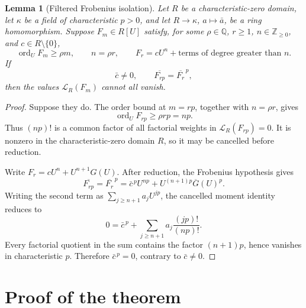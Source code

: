 \documentclass[11pt]{article}
\newtheorem{lemma}[theorem]{Lemma}
\newcommand{\ord}{\operatorname{ord}}
\begin{document}
\begin{lemma}[Filtered Frobenius isolation]
\label{lem:filtered-frobenius}
Let \(R\) be a characteristic-zero domain, let \(\kappa\) be a field of
characteristic \(p>0\), and let \(R\to\kappa\), \(a\mapsto\bar a\), be a
ring homomorphism.  Suppose \(F_m\in R[U]\) satisfy, for some
\(\rho\in\mathbb Q\), \(r\geq1\), \(n\in\mathbb Z_{\geq0}\), and
\(c\in R\setminus\{0\}\),
\[
  \ord_UF_m\geq\rho m,\qquad
  n=\rho r,\qquad
  F_r=cU^n+\text{terms of degree greater than }n.
\]
If
\[
  \bar c\neq0,\qquad
  \overline{F_{rp}}=\overline{F_r}^{\,p},
\]
then the values \(\mathcal L_R(F_m)\) cannot all vanish.
\end{lemma}

\begin{proof}
Suppose they do.  The order bound at \(m=rp\), together with
\(n=\rho r\), gives
\[
  \ord_UF_{rp}\geq \rho rp=np.
\]
Thus \((np)!\) is a common factor of all factorial weights in
\(\mathcal L_R(F_{rp})=0\).  It is nonzero in the characteristic-zero
domain \(R\), so it may be cancelled before reduction.

Write \(F_r=cU^n+U^{n+1}G(U)\).  After reduction, the Frobenius hypothesis
gives
\[
  \overline{F_{rp}}
  =\overline{F_r}^{\,p}
  =\bar c^{\,p}U^{np}+U^{(n+1)p}\overline{G}(U)^p.
\]
Writing the second term as
\(\sum_{j\geq n+1}a_jU^{jp}\), the cancelled moment identity reduces to
\[
  0=\bar c^{\,p}
    +\sum_{j\geq n+1}a_j\frac{(jp)!}{(np)!}.
\]
Every factorial quotient in the sum contains the factor \((n+1)p\), hence
vanishes in characteristic \(p\).  Therefore \(\bar c^{\,p}=0\), contrary
to \(\bar c\neq0\).
\end{proof}

\section{Proof of the theorem}
\end{document}
